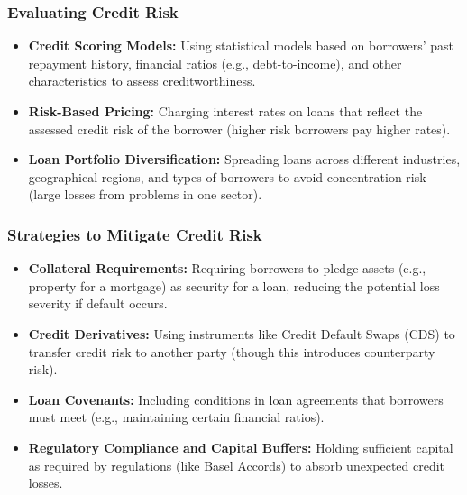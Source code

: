 \subsubsection{Evaluating Credit Risk}
\begin{itemize}
    \item \textbf{Credit Scoring Models:} Using statistical models based on borrowers' past repayment history, financial ratios (e.g., debt-to-income), and other characteristics to assess creditworthiness.
    \item \textbf{Risk-Based Pricing:} Charging interest rates on loans that reflect the assessed credit risk of the borrower (higher risk borrowers pay higher rates).
    \item \textbf{Loan Portfolio Diversification:} Spreading loans across different industries, geographical regions, and types of borrowers to avoid concentration risk (large losses from problems in one sector).
\end{itemize}

\subsubsection{Strategies to Mitigate Credit Risk}
\begin{itemize}
    \item \textbf{Collateral Requirements:} Requiring borrowers to pledge assets (e.g., property for a mortgage) as security for a loan, reducing the potential loss severity if default occurs.
    \item \textbf{Credit Derivatives:} Using instruments like Credit Default Swaps (CDS) to transfer credit risk to another party (though this introduces counterparty risk).
    \item \textbf{Loan Covenants:} Including conditions in loan agreements that borrowers must meet (e.g., maintaining certain financial ratios).
    \item \textbf{Regulatory Compliance and Capital Buffers:} Holding sufficient capital as required by regulations (like Basel Accords) to absorb unexpected credit losses.
\end{itemize}

